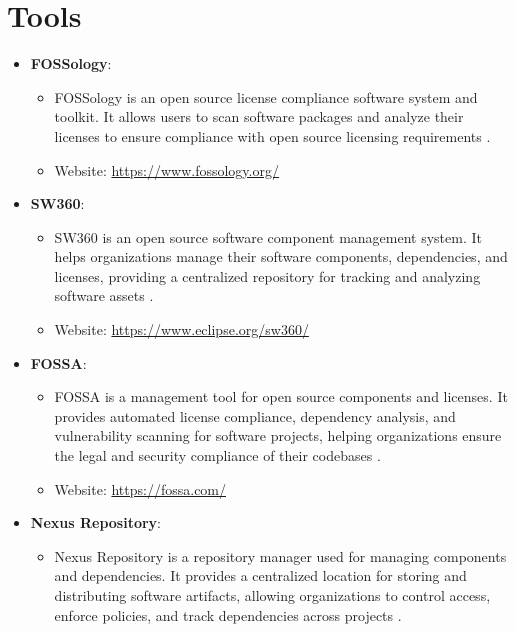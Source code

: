 \section{Tools}
\begin{itemize}
	\item \textbf{FOSSology}:
	\begin{itemize}
		\item FOSSology is an open source license compliance software system and toolkit.
		It allows users to scan software packages and analyze their licenses to
		ensure compliance with open source licensing requirements
		\cite{FOSSology:2017}.
		
		\item Website: \url{https://www.fossology.org/}
	\end{itemize}
	
	\item \textbf{SW360}:
	\begin{itemize}
		\item SW360 is an open source software component management system. It
		helps organizations manage their software components, dependencies, and
		licenses, providing a centralized repository for tracking and analyzing software
		assets \cite{SW360:2024}.
		
		\item Website: \url{https://www.eclipse.org/sw360/}
	\end{itemize}
	
	\item \textbf{FOSSA}:
	\begin{itemize}
		\item FOSSA is a management tool for open source components and licenses.
		It provides automated license compliance, dependency analysis, and
		vulnerability scanning for software projects, helping organizations ensure
		the legal and security compliance of their codebases \cite{FOSSA:2024}.
		
		\item Website: \url{https://fossa.com/}
	\end{itemize}
	
	\item \textbf{Nexus Repository}:
	\begin{itemize}
		\item Nexus Repository is a repository manager used for managing components
		and dependencies. It provides a centralized location for storing and
		distributing software artifacts, allowing organizations to control access,
		enforce policies, and track dependencies across projects \cite{ Sonatype:2024}.
		

\end{itemize}
\end{itemize}
